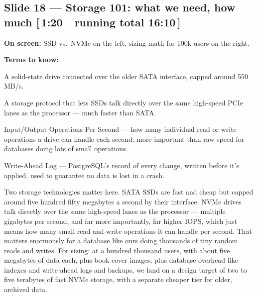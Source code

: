 \documentclass[11pt]{article}
\newcommand{\onscreen}[1]{\noindent\textbf{\color{sovGrey}On screen:} #1\par\vspace{4pt}}
\newcommand{\timing}[2]{\hfill{\normalsize\color{sovGrey}[\,#1\ \textbar\ running total #2\,]}}
\newenvironment{terms}
  {\noindent\textbf{\color{sovGrey}Terms to know:}
   \begin{description}[leftmargin=0pt,style=sameline,labelindent=0pt,itemsep=2pt,topsep=2pt,font=\normalfont\bfseries\color{sovDark}]}
  {\end{description}\vspace{2pt}}
\begin{document}
\subsection*{Slide 18 --- Storage 101: what we need, how much \timing{1:20}{16:10}}
\onscreen{SSD vs.\ NVMe on the left, sizing math for 100k users on the right.}
\begin{terms}
  \item[SATA SSD] A solid-state drive connected over the older SATA interface,
    capped around 550 MB/s.
  \item[NVMe] A storage protocol that lets SSDs talk directly over the same
    high-speed PCIe lanes as the processor --- much faster than SATA.
  \item[IOPS] Input/Output Operations Per Second --- how many individual read or
    write operations a drive can handle each second; more important than raw speed for
    databases doing lots of small operations.
  \item[WAL] Write-Ahead Log --- PostgreSQL's record of every change, written before
    it's applied, used to guarantee no data is lost in a crash.
\end{terms}
\begin{sayit}
Two storage technologies matter here. SATA SSDs are fast and cheap but capped around
five hundred fifty megabytes a second by their interface. NVMe drives talk directly over
the same high-speed lanes as the processor --- multiple gigabytes per second, and far
more importantly, far higher IOPS, which just means how many small read-and-write
operations it can handle per second. That matters enormously for a database like ours
doing thousands of tiny random reads and writes. For sizing: at a hundred thousand
users, with about five megabytes of data each, plus book cover images, plus database
overhead like indexes and write-ahead logs and backups, we land on a design target of
two to five terabytes of fast NVMe storage, with a separate cheaper tier for older,
archived data.
\end{sayit}
\end{document}

